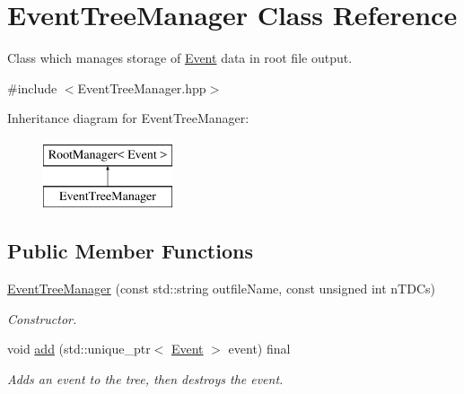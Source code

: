 \hypertarget{class_event_tree_manager}{}\section{Event\+Tree\+Manager Class Reference}
\label{class_event_tree_manager}


Class which manages storage of \hyperlink{class_event}{Event} data in root file output.  




{\ttfamily \#include $<$Event\+Tree\+Manager.\+hpp$>$}

Inheritance diagram for Event\+Tree\+Manager\+:\begin{figure}[H]
\begin{center}
\leavevmode
\includegraphics[height=2.000000cm]{class_event_tree_manager}
\end{center}
\end{figure}
\subsection*{Public Member Functions}
\begin{DoxyCompactItemize}
\item 
\hyperlink{class_event_tree_manager_ac97238d5991e325f1de2268684889c63}{Event\+Tree\+Manager} (const std\+::string outfile\+Name, const unsigned int n\+T\+D\+Cs)
\begin{DoxyCompactList}\small\item\em Constructor. \end{DoxyCompactList}\item 
void \hyperlink{class_event_tree_manager_acabb2f6c8dd0e08375b4cf8bf2c148fd}{add} (std\+::unique\+\_\+ptr$<$ \hyperlink{class_event}{Event} $>$ event) final
\begin{DoxyCompactList}\small\item\em Adds an event to the tree, then destroys the event. \end{DoxyCompactList}\end{DoxyCompactItemize}
